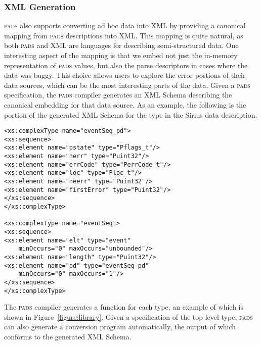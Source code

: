 \documentclass{sigplanconf}
\newcommand{\dibbler}{Sirius}
\newcommand{\figref}[1]{Figure~\ref{#1}}
\newcommand{\pads}{\textsc{pads}}
\begin{document}
\subsubsection{XML Generation}
\pads{} also supports converting ad hoc data into XML by providing a canonical mapping from \pads{} descriptions into XML.  This mapping is quite natural, as both \pads{} and XML are languages for describing semi-structured data.
One interesting aspect of the mapping is that we embed not just the in-memory representation of \pads{} values, but also the parse descriptors in cases where the data was buggy.  This choice allows users to explore the error portions
of their data sources, which can be the most interesting parts of the data.
Given a \pads{} specification, the \pads{} compiler generates an XML Schema describing the canonical embedding for that data source.  As an example, 
the following is the portion of the generated XML Schema for the  type in the \dibbler{} data description.

\begin{small}
\begin{verbatim}
<xs:complexType name="eventSeq_pd">
<xs:sequence>
<xs:element name="pstate" type="Pflags_t"/>
<xs:element name="nerr" type="Puint32"/>
<xs:element name="errCode" type="PerrCode_t"/>
<xs:element name="loc" type="Ploc_t"/>
<xs:element name="neerr" type="Puint32"/>
<xs:element name="firstError" type="Puint32"/>
</xs:sequence>
</xs:complexType>

<xs:complexType name="eventSeq">
<xs:sequence>
<xs:element name="elt" type="event" 
    minOccurs="0" maxOccurs="unbounded"/>
<xs:element name="length" type="Puint32"/>
<xs:element name="pd" type="eventSeq_pd" 
    minOccurs="0" maxOccurs="1"/>
</xs:sequence>
</xs:complexType>
\end{verbatim} 
\end{small}
The \pads{} compiler generates a  function for each type, an example of which is shown in \figref{figure:library}.  Given a specification of the top level type, \pads{} can also generate a conversion program automatically, the output of which conforms to the generated XML Schema.
\end{document}

